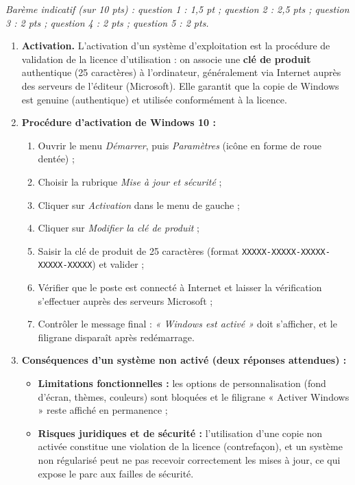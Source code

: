 \documentclass[11pt]{article}
\newcommand{\cle}[1]{{\popxbold\color{popdark}#1}}
\begin{document}
\begin{corrige}
\emph{Barème indicatif (sur 10 pts) : question 1 : 1,5 pt ; question 2 : 2,5 pts ; question 3 : 2 pts ; question 4 : 2 pts ; question 5 : 2 pts.}
\begin{enumerate}
\item \textbf{Activation.} L'activation d'un système d'exploitation est la procédure de validation de la licence d'utilisation : on associe une \textbf{clé de produit} authentique (25 caractères) à l'ordinateur, généralement via Internet auprès des serveurs de l'éditeur (Microsoft). Elle garantit que la copie de Windows est \cle{genuine} (authentique) et utilisée conformément à la licence.
\item \textbf{Procédure d'activation de Windows 10 :}
\begin{enumerate}
\item Ouvrir le menu \emph{Démarrer}, puis \emph{Paramètres} (icône en forme de roue dentée) ;
\item Choisir la rubrique \emph{Mise à jour et sécurité} ;
\item Cliquer sur \emph{Activation} dans le menu de gauche ;
\item Cliquer sur \emph{Modifier la clé de produit} ;
\item Saisir la clé de produit de 25 caractères (format \texttt{XXXXX-XXXXX-XXXXX-XXXXX-XXXXX}) et valider ;
\item Vérifier que le poste est connecté à Internet et laisser la vérification s'effectuer auprès des serveurs Microsoft ;
\item Contrôler le message final : \emph{« Windows est activé »} doit s'afficher, et le filigrane disparaît après redémarrage.
\end{enumerate}
\item \textbf{Conséquences d'un système non activé (deux réponses attendues) :}
\begin{itemize}
\item \textbf{Limitations fonctionnelles :} les options de personnalisation (fond d'écran, thèmes, couleurs) sont bloquées et le filigrane « Activer Windows » reste affiché en permanence ;
\item \textbf{Risques juridiques et de sécurité :} l'utilisation d'une copie non activée constitue une violation de la licence (contrefaçon), et un système non régularisé peut ne pas recevoir correctement les mises à jour, ce qui expose le parc aux failles de sécurité.
\end{itemize}

\end{enumerate}
\end{corrige}
\end{document}
